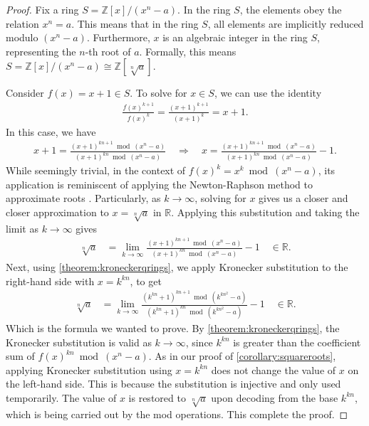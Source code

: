 \documentclass[12pt]{article}
\theoremstyle{plain}
\theoremstyle{definition}
\begin{document}
\begin{proof}
Fix a ring $S = \mathbb{Z}[x]/(x^n - a)$. In the ring $S$, the elements obey the relation $x^n = a$. This means that in the ring $S$, all elements are implicitly reduced modulo $(x^n - a)$. Furthermore, $x$ is an algebraic integer in the ring $S$, representing the $n$-th root of $a$. Formally, this means $S = \mathbb{Z}[x]/(x^n - a) \cong \mathbb{Z}[\sqrt[n]{a}]$.

Consider $f(x) = x+1 \in S$. To solve for $x \in S$, we can use the identity
\begin{align*}
    \frac{f(x)^{k+1}}{f(x)^k} = \frac{(x+1)^{k+1}}{(x+1)^k} = x + 1 .
\end{align*}
In this case, we have
\begin{align*}
    x + 1 = \frac{(x+1)^{kn+1} \bmod (x^n-a)}{(x+1)^{kn} \bmod (x^n-a)}
    \quad \Longrightarrow \quad
    x = \frac{(x+1)^{kn+1} \bmod (x^n-a)}{(x+1)^{kn} \bmod (x^n-a)} - 1 .
\end{align*}
While seemingly trivial, in the context of $f(x)^k = x^k \bmod (x^n-a)$, its application is reminiscent of applying the Newton-Raphson method to approximate roots \cite{hubbard2001roots}. Particularly, as $k\rightarrow\infty$, solving for $x$ gives us a closer and closer approximation to $x = \sqrt[n]{a}$ in $\mathbb{R}$. Applying this substitution and taking the limit as $k\rightarrow\infty$ gives
\begin{align*}
    \sqrt[n]{a} &= \lim_{k\rightarrow\infty}
    \frac{(x+1)^{kn+1} \bmod (x^n-a)}
    {(x+1)^{kn} \bmod (x^n-a)} - 1
    \quad \in \mathbb{R} .
\end{align*}
Next, using \cref{theorem:kroneckerqrings}, we apply Kronecker substitution to the right-hand side with $x = k^{kn}$, to get
\begin{align*}
\sqrt[n]{a} &= \lim_{k\rightarrow\infty}
    \frac{(k^{kn} + 1)^{kn+1} \bmod{(k^{kn^2}-a)}}
    {(k^{kn} + 1)^{kn} \bmod{ (k^{kn^2}-a)}} - 1  \quad \in \mathbb{R} .
\end{align*}
Which is the formula we wanted to prove. By \cref{theorem:kroneckerqrings}, the Kronecker substitution is valid as $k\rightarrow\infty$, since $k^{kn}$ is greater than the coefficient sum of $f(x)^{kn} \bmod{(x^n-a)}$. As in our proof of \cref{corollary:squareroots}, applying Kronecker substitution using $x=k^{kn}$ does not change the value of $x$ on the left-hand side. This is because the substitution is injective and only used temporarily. The value of $x$ is restored to $\sqrt[n]{a}$ upon decoding from the base $k^{kn}$, which is being carried out by the mod operations. This complete the proof.
\end{proof}
\end{document}
